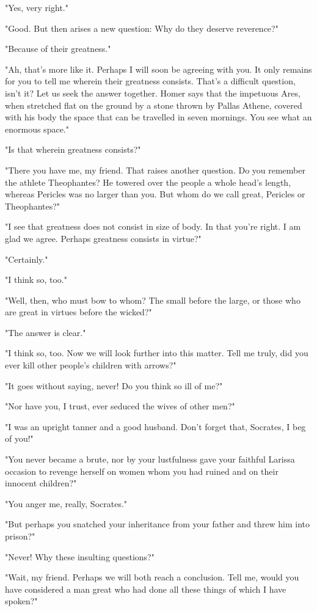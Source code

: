 "Yes, very right."

"Good. But then arises a new question: Why do they deserve reverence?"

"Because of their greatness."

"Ah, that's more like it. Perhaps I will soon be agreeing with you. It
only remains for you to tell me wherein their greatness consists.
That's a difficult question, isn't it? Let us seek the answer
together. Homer says that the impetuous Ares, when stretched flat on
the ground by a stone thrown by Pallas Athene, covered with his body
the space that can be travelled in seven mornings. You see what an
enormous space."

"Is that wherein greatness consists?"

"There you have me, my friend. That raises another question. Do you
remember the athlete Theophantes? He towered over the people a whole
head's length, whereas Pericles was no larger than you. But whom do we
call great, Pericles or Theophantes?"

"I see that greatness does not consist in size of body. In that you're
right. I am glad we agree. Perhaps greatness consists in virtue?"

"Certainly."

"I think so, too."

"Well, then, who must bow to whom? The small before the large, or
those who are great in virtues before the wicked?"

"The answer is clear."

"I think so, too. Now we will look further into this matter. Tell me
truly, did you ever kill other people's children with arrows?"

"It goes without saying, never! Do you think so ill of me?"

"Nor have you, I trust, ever seduced the wives of other men?"

"I was an upright tanner and a good husband. Don't forget that,
Socrates, I beg of you!"

"You never became a brute, nor by your lustfulness gave your faithful
Larissa occasion to revenge herself on women whom you had ruined and
on their innocent children?"

"You anger me, really, Socrates."

"But perhaps you snatched your inheritance from your father and threw
him into prison?"

"Never! Why these insulting questions?"

"Wait, my friend. Perhaps we will both reach a conclusion. Tell me,
would you have considered a man great who had done all these things of
which I have spoken?"

